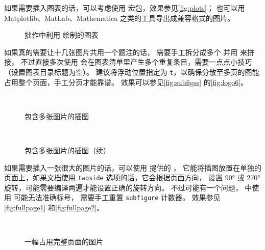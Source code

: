 如果需要插入图表的话，可以考虑使用  宏包，效果参见\autoref{fig:plots}；
也可以用 Matplotlib、MatLab、Mathematica 之类的工具导出成兼容格式的图片。

\begin{figure}[htb]
   \quad
  \caption{拙作中利用  绘制的图表}
  \label{fig:plots}
\end{figure}

如果真的需要让十几张图片共用一个题注的话，
需要手工拆分成多个  并用  来拼接，
不过直接多次使用  会在图表清单里产生多个重复条目，需要一点点小技巧
（设置图表目录标题为空）。
建议将浮动位置指定为 \verb|t|，以确保分散至多页的图能占用整个页面，手工分页才能靠谱。
效果可以参见\autoref{fig:subfigss} 的\autoref{fig:logo6}。

\begin{figure}[t]
  \quad
  \\
  \quad
  \caption{包含多张图片的插图}
  \label{fig:subfigss}
\end{figure}
\begin{figure}[t]
  \ContinuedFloat
  \quad
  \\
  \quad
  \caption[]{包含多张图片的插图（续）}
\end{figure}

如果需要插入一张很大的图片的话，可以使用  提供的 ，
它能将插图放置在单独的页面上，如果文档使用 \verb|twoside| 选项的话，它会根据页面方向，
设置 \ang{90} 或 \ang{270} 旋转，可能需要编译两遍才能设置正确的旋转方向。
不过可能有一个问题， 中使用  可能无法准确标号，
需要手工重置 \texttt{subfigure} 计数器。
效果参见\autoref{fig:fullpage1} 和\autoref{fig:fullpage2}。

\setcounter{subfigure}{0}
\begin{sidewaysfigure}
   \\
  \caption{一幅占用完整页面的图片}
  \label{fig:fullpage1}
\end{sidewaysfigure}

